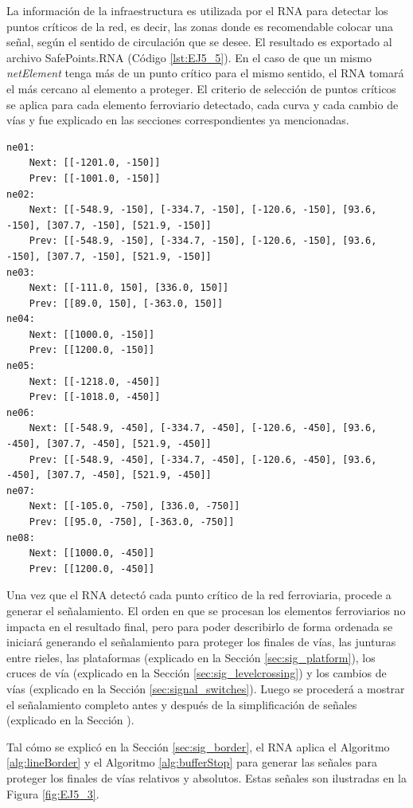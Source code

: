 	La información de la infraestructura es utilizada por el RNA para detectar los puntos críticos de la red, es decir, las zonas donde es recomendable colocar una señal, según el sentido de circulación que se desee. El resultado es exportado al archivo SafePoints.RNA (Código \ref{lst:EJ5_5}). En el caso de que un mismo \textit{netElement} tenga más de un punto crítico para el mismo sentido, el RNA tomará el más cercano al elemento a proteger. El criterio de selección de puntos críticos se aplica para cada elemento ferroviario detectado, cada curva y cada cambio de vías y fue explicado en las secciones correspondientes ya mencionadas.
	
	\begin{lstlisting}[language = {}, caption = SafePoints.RNA, label = {lst:EJ5_5}]
ne01:
	Next: [[-1201.0, -150]]
	Prev: [[-1001.0, -150]]
ne02:
	Next: [[-548.9, -150], [-334.7, -150], [-120.6, -150], [93.6, -150], [307.7, -150], [521.9, -150]]
	Prev: [[-548.9, -150], [-334.7, -150], [-120.6, -150], [93.6, -150], [307.7, -150], [521.9, -150]]
ne03:
	Next: [[-111.0, 150], [336.0, 150]]
	Prev: [[89.0, 150], [-363.0, 150]]
ne04:
	Next: [[1000.0, -150]]
	Prev: [[1200.0, -150]]
ne05:
	Next: [[-1218.0, -450]]
	Prev: [[-1018.0, -450]]
ne06:
	Next: [[-548.9, -450], [-334.7, -450], [-120.6, -450], [93.6, -450], [307.7, -450], [521.9, -450]]
	Prev: [[-548.9, -450], [-334.7, -450], [-120.6, -450], [93.6, -450], [307.7, -450], [521.9, -450]]
ne07:
	Next: [[-105.0, -750], [336.0, -750]]
	Prev: [[95.0, -750], [-363.0, -750]]
ne08:
	Next: [[1000.0, -450]]
	Prev: [[1200.0, -450]]
	\end{lstlisting}	
	
	Una vez que el RNA detectó cada punto crítico de la red ferroviaria, procede a generar el señalamiento. El orden en que se procesan los elementos ferroviarios no impacta en el resultado final, pero para poder describirlo de forma ordenada se iniciará generando el señalamiento para proteger los finales de vías, las junturas entre rieles, las plataformas (explicado en la Sección \ref{sec:sig_platform}), los cruces de vía (explicado en la Sección \ref{sec:sig_levelcrossing}) y los cambios de vías (explicado en la Sección \ref{sec:signal_switches}). Luego se procederá a mostrar el señalamiento completo antes y después de la simplificación de señales (explicado en la Sección \label{sec:simplificacion}). 
	
	Tal cómo se explicó en la Sección \ref{sec:sig_border}, el RNA aplica el Algoritmo \ref{alg:lineBorder} y el Algoritmo \ref{alg:bufferStop} para generar las señales para proteger los finales de vías relativos y absolutos. Estas señales son ilustradas en la Figura \ref{fig:EJ5_3}.

